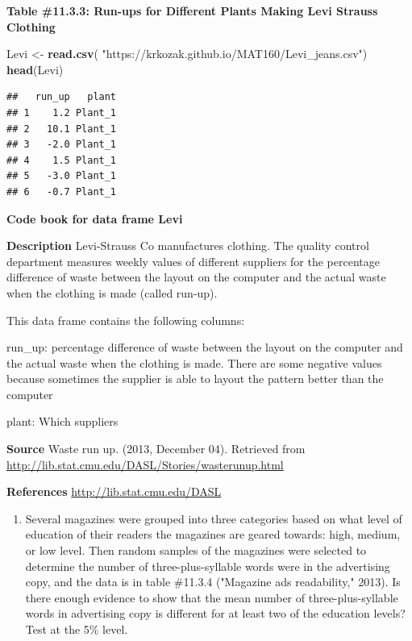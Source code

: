 \documentclass[
]{book}
\newenvironment{Shaded}{\begin{snugshade}}{\end{snugshade}}
\newcommand{\KeywordTok}[1]{\textcolor[rgb]{0.13,0.29,0.53}{\textbf{#1}}}
\newcommand{\NormalTok}[1]{#1}
\newcommand{\StringTok}[1]{\textcolor[rgb]{0.31,0.60,0.02}{#1}}
\providecommand{\tightlist}{%
  \setlength{\itemsep}{0pt}\setlength{\parskip}{0pt}}
\begin{document}
\textbf{Table \#11.3.3: Run-ups for Different Plants Making Levi Strauss Clothing}

\begin{Shaded}
\begin{Highlighting}[]
\NormalTok{Levi <-}\StringTok{ }\KeywordTok{read.csv}\NormalTok{(}
  \StringTok{"https://krkozak.github.io/MAT160/Levi_jeans.csv"}\NormalTok{)}
\KeywordTok{head}\NormalTok{(Levi)}
\end{Highlighting}
\end{Shaded}

\begin{verbatim}
##   run_up   plant
## 1    1.2 Plant_1
## 2   10.1 Plant_1
## 3   -2.0 Plant_1
## 4    1.5 Plant_1
## 5   -3.0 Plant_1
## 6   -0.7 Plant_1
\end{verbatim}

\textbf{Code book for data frame Levi}

\textbf{Description}
Levi-Strauss Co manufactures clothing. The quality control department measures weekly values of different suppliers for the percentage difference of waste between the layout on the computer and the actual waste when the clothing is made (called run-up).

This data frame contains the following columns:

run\_up: percentage difference of waste between the layout on the computer and the actual waste when the clothing is made. There are some negative values because sometimes the supplier is able to layout the pattern better than the computer

plant: Which suppliers

\textbf{Source}
Waste run up. (2013, December 04). Retrieved from \url{http://lib.stat.cmu.edu/DASL/Stories/wasterunup.html}

\textbf{References}
\url{http://lib.stat.cmu.edu/DASL}

\begin{enumerate}
\def\labelenumi{\arabic{enumi}.}
\setcounter{enumi}{2}
\tightlist
\item
  Several magazines were grouped into three categories based on what level of education of their readers the magazines are geared towards: high, medium, or low level. Then random samples of the magazines were selected to determine the number of three-plus-syllable words were in the advertising copy, and the data is in table \#11.3.4 ("Magazine ads readability," 2013). Is there enough evidence to show that the mean number of three-plus-syllable words in advertising copy is different for at least two of the education levels? Test at the 5\% level.
\end{enumerate}
\end{document}
